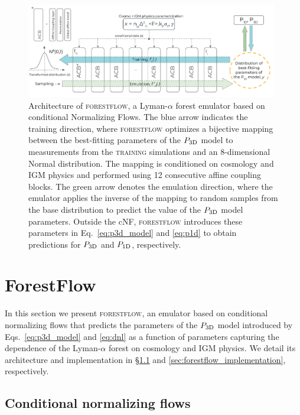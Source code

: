 \documentclass{aa}
\newcommand{\lyaf}{Lyman-$\alpha$ forest\xspace}
\newcommand{\poned}{\ensuremath{P_{\rm 1D}}\xspace}
\newcommand{\pthreed}{\ensuremath{P_{\rm 3D}}\xspace}
\newcommand{\forestflow}{\textsc{forestflow}\xspace}
\newcommand{\lacehc}{\textsc{training}\xspace}
\begin{document}

\begin{figure}
    \includegraphics[width= 0.98\textwidth]{figures/network_architecture.png} 
    \centering
    \caption{Architecture of \forestflow, a \lyaf emulator based on conditional Normalizing Flows. The blue arrow indicates the training direction, where \forestflow optimizes a bijective mapping between the best-fitting parameters of the \pthreed model to measurements from the \lacehc simulations and an 8-dimensional Normal distribution. The mapping is conditioned on cosmology and IGM physics and performed using 12 consecutive affine coupling blocks. The green arrow denotes the emulation direction, where the emulator applies the inverse of the mapping to random samples from the base distribution to predict the value of the \pthreed model parameters. Outside the cNF, \forestflow introduces these parameters in Eq.~\ref{eq:p3d_model} and \ref{eq:p1d} to obtain predictions for \pthreed and \poned, respectively.}
    \label{fig:net_architecture}
 \end{figure}

\section{ForestFlow}
\label{sec:forestflow}

In this section we present \forestflow, an emulator based on conditional normalizing flows that predicts the parameters of the \pthreed model introduced by Eqs.~\ref{eq:p3d_model} and \ref{eq:dnl} as a function of parameters capturing the dependence of the \lyaf on cosmology and IGM physics. We detail its architecture and implementation in \S\ref{sec:forestflow_NF} and \ref{sec:forestflow_implementation}, respectively.


\subsection{Conditional normalizing flows}
\label{sec:forestflow_NF}
\end{document}
